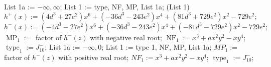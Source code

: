 \documentclass[noend]{amsproc}
\theoremstyle{definition}
\DeclareMathOperator{\MP}{MP}
\DeclareMathOperator{\type}{type}
\DeclareMathOperator{\val}{value}
\DeclareMathOperator{\NF}{NF}
\begin{document}
\begin{algorithm}[ht]
\begin{algorithmic}[1]
\State List 1a := $-\infty, \infty$;
\EndIf
\EndIf
\State List 1 := type, NF, MP, List 1a;
\Return (List 1)
\Else
\State $h^+(x):=(4d^3+27e^2)x^6+(-36d^3-243e^2)x^4+(81d^3+729e^2)x^2-729e^2;$
\State $h^-(x):=(-4d^3-27e^2)x^6+(-36d^3-243e^2)x^4+(-81d^3-729e^2)x^2-729e^2;$
\State $\MP_1 := $ factor of $h^-(z)$ with negative real root;
\State $\NF_1 := x^3+ax^2y^2-xy^4$;
\State $\type_1 := J_{10}^-$;
\State List 1a := $-\infty, 0$;
\State List 1 := type 1, NF, MP, List 1a;
\Else
\State $MP_1 := $ factor of $h^-(z)$ with positive real root;
\State $NF_1 := x^3+ax^2y^2-xy^4$;
\State $\type_1 := J_{10}^-$;
\end{algorithmic}
\end{algorithm}
\end{document}

